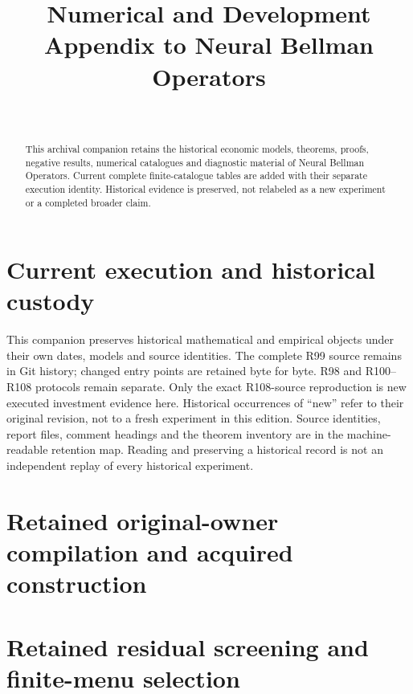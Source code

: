 \documentclass[ecta,nameyear,draft]{econsocart}
\begin{document}
\begin{frontmatter}
\title{Numerical and Development Appendix to Neural Bellman Operators}
\begin{aug}
\author[id=au1,addressref={add1}]{~}
\address[id=add1]{Peking University}
\end{aug}
\begin{abstract}This archival companion retains the historical economic models, theorems, proofs, negative results, numerical catalogues and diagnostic material of Neural Bellman Operators. Current complete finite-catalogue tables are added with their separate execution identity. Historical evidence is preserved, not relabeled as a new experiment or a completed broader claim.\end{abstract}
\end{frontmatter}
\appendix
\renewcommand{\thetheorem}{A.\arabic{theorem}}
\renewcommand{\theequation}{A.\arabic{equation}}
\renewcommand{\thesection}{\AlphAlph{\value{section}}}
\section{Current execution and historical custody}\label{dev:custody109}
This companion preserves historical mathematical and empirical objects under their own dates, models and source identities. The complete R99 source remains in Git history; changed entry points are retained byte for byte. R98 and R100--R108 protocols remain separate. Only the exact R108-source reproduction is new executed investment evidence here. Historical occurrences of ``new'' refer to their original revision, not to a fresh experiment in this edition. Source identities, report files, comment headings and the theorem inventory are in the machine-readable retention map. Reading and preserving a historical record is not an independent replay of every historical experiment.

\section{Retained original-owner compilation and acquired construction}\label{dev:core109}

\section{Retained residual screening and finite-menu selection}\label{dev:selection109}




\end{document}
